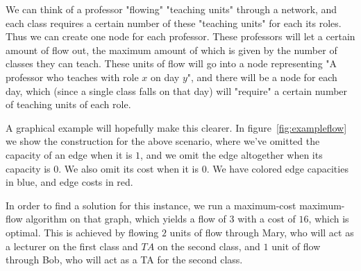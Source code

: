 We can think of a professor "flowing" "teaching units" through a network, and each class requires a certain number of these "teaching units" for each its roles. Thus we can create one node for each professor. These professors will let a certain amount of flow out, the maximum amount of which is given by the number of classes they can teach. These units of flow will go into a node representing "A professor who teaches with role $x$ on day $y$", and there will be a node for each day, which (since a single class falls on that day) will "require" a certain number of teaching units of each role.

A graphical example will hopefully make this clearer. In figure~\ref{fig:exampleflow} we show the construction for the above scenario, where we've omitted the capacity of an edge when it is $1$, and we omit the edge altogether when its capacity is $0$. We also omit its cost when it is $0$. We have colored  edge capacities in blue, and edge costs in red.

In order to find a solution for this instance, we run a maximum-cost maximum-flow algorithm on that graph, which yields a flow of $3$ with a cost of $16$, which is optimal. This is achieved by flowing $2$ units of flow through Mary, who will act as a lecturer on the first class and $TA$ on the second class, and $1$ unit of flow through Bob, who will act as a TA for the second class.

